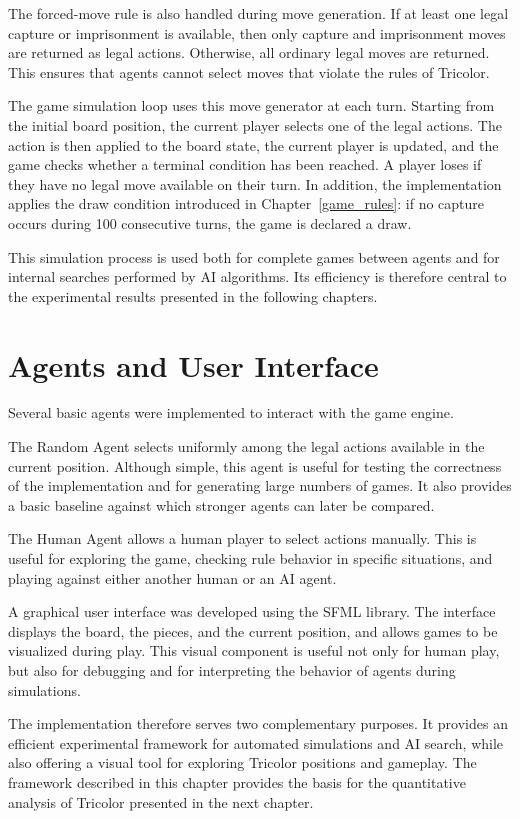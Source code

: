 The forced-move rule is also handled during move generation. If at least one legal capture or imprisonment is available, then only capture and imprisonment moves are returned as legal actions. Otherwise, all ordinary legal moves are returned. This ensures that agents cannot select moves that violate the rules of Tricolor.

The game simulation loop uses this move generator at each turn. Starting from the initial board position, the current player selects one of the legal actions. The action is then applied to the board state, the current player is updated, and the game checks whether a terminal condition has been reached. A player loses if they have no legal move available on their turn. In addition, the implementation applies the draw condition introduced in Chapter~\ref{game_rules}: if no capture occurs during 100 consecutive turns, the game is declared a draw.

This simulation process is used both for complete games between agents and for internal searches performed by AI algorithms. Its efficiency is therefore central to the experimental results presented in the following chapters.

\section{Agents and User Interface}

Several basic agents were implemented to interact with the game engine.

The Random Agent selects uniformly among the legal actions available in the current position. Although simple, this agent is useful for testing the correctness of the implementation and for generating large numbers of games. It also provides a basic baseline against which stronger agents can later be compared.

The Human Agent allows a human player to select actions manually. This is useful for exploring the game, checking rule behavior in specific situations, and playing against either another human or an AI agent.

A graphical user interface was developed using the SFML library. The interface displays the board, the pieces, and the current position, and allows games to be visualized during play. This visual component is useful not only for human play, but also for debugging and for interpreting the behavior of agents during simulations.

The implementation therefore serves two complementary purposes. It provides an efficient experimental framework for automated simulations and AI search, while also offering a visual tool for exploring Tricolor positions and gameplay. The framework described in this chapter provides the basis for the quantitative analysis of Tricolor presented in the next chapter.

